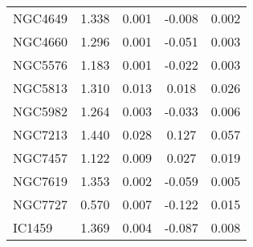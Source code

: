 \begin{tabular}{lcccc}
NGC4649 & 1.338 & 0.001 & -0.008 & 0.002 \\
NGC4660 & 1.296 & 0.001 & -0.051 & 0.003 \\
NGC5576 & 1.183 & 0.001 & -0.022 & 0.003 \\
NGC5813 & 1.310 & 0.013 &  0.018 & 0.026 \\
NGC5982 & 1.264 & 0.003 & -0.033 & 0.006 \\
NGC7213 & 1.440 & 0.028 &  0.127 & 0.057 \\
NGC7457 & 1.122 & 0.009 &  0.027 & 0.019 \\
NGC7619 & 1.353 & 0.002 & -0.059 & 0.005 \\
NGC7727 & 0.570 & 0.007 & -0.122 & 0.015 \\
IC1459 & 1.369 & 0.004 & -0.087 & 0.008 \\
\end{tabular}
